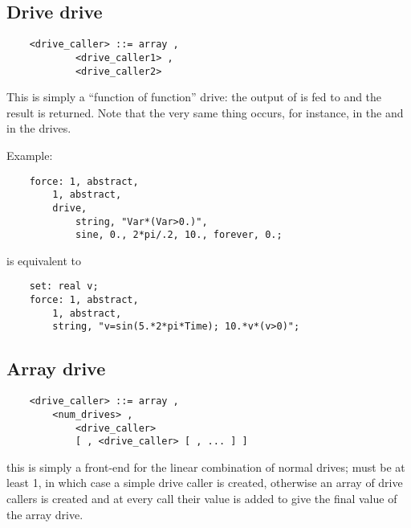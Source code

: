 \subsection{Drive drive}
\begin{verbatim}
    <drive_caller> ::= array ,
            <drive_caller1> , 
            <drive_caller2>
\end{verbatim}
This is simply a ``function of function'' drive: the output 
of  is fed to 
and the result is returned.
Note that the very same thing occurs, for instance, in the
 and in the  drives.

\noindent
Example:
\begin{verbatim}
    force: 1, abstract,
        1, abstract,
        drive,
            string, "Var*(Var>0.)",
            sine, 0., 2*pi/.2, 10., forever, 0.;
\end{verbatim}
is equivalent to
\begin{verbatim}
    set: real v;
    force: 1, abstract,
        1, abstract,
        string, "v=sin(5.*2*pi*Time); 10.*v*(v>0)";
\end{verbatim}


\subsection{Array drive}
\begin{verbatim}
    <drive_caller> ::= array ,
        <num_drives> ,
            <drive_caller> 
            [ , <drive_caller> [ , ... ] ]
\end{verbatim}
this is simply a front-end for the linear combination of  
normal drives;  must be at least 1, in which case 
a simple drive caller is created, otherwise an array of drive callers 
is created and at every call their value is added to give 
the final value of the array drive.


